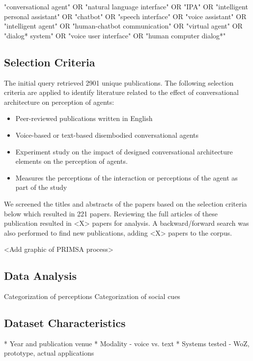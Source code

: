 \documentclass[sigconf,screen,review, anonymous]{acmart}
\begin{document}
\begin{mdframed}
"conversational agent" OR "natural language interface" OR "IPA" OR "intelligent personal assistant" OR "chatbot" OR "speech interface" OR "voice assistant" OR "intelligent agent" OR "human-chatbot communication" OR "virtual agent" OR "dialog* system" OR "voice user interface" OR "human computer dialog*"
\end{mdframed}

\subsection{Selection Criteria}
The initial query retrieved 2901 unique publications. The following selection criteria are applied to identify literature related to the effect of conversational architecture on perception of agents:
\begin{itemize}
  \item Peer-reviewed publications written in English
  \item Voice-based or text-based disembodied conversational agents
  \item Experiment study on the impact of designed conversational architecture elements on the perception of agents.
  \item Measures the perceptions of the interaction or perceptions of the agent as part of the study
\end{itemize}

We screened the titles and abstracts of the papers based on the selection criteria below which resulted in 221 papers. Reviewing the full articles of these publication resulted in <X> papers for analysis. A backward/forward search was also performed to find new publications, adding <X> papers to the corpus.

<Add graphic of PRIMSA process>

\subsection{Data Analysis}

Categorization of perceptions \newline
Categorization of social cues \newline

\subsection{Dataset Characteristics}
* Year and publication venue
\newline
* Modality - voice vs. text
\newline
* Systems tested - WoZ, prototype, actual applications
\end{document}
